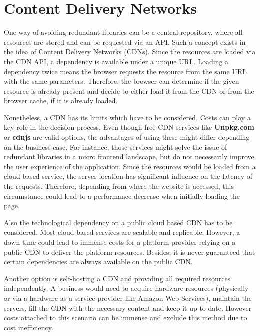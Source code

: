 \chapter{Content Delivery Networks} %
\label{Chapter3}


One way of avoiding redundant libraries can be a central repository, where all resources are stored and can be requested via an API. Such a concept exists in the idea of Content Delivery Networks (CDNs).
Since the resources are loaded via the CDN API, a dependency is available under a unique URL. Loading a dependency twice means the browser requests the resource from the same URL with the same parameters. Therefore, the browser can determine if the given resource is already present and decide to either load it from the CDN or from the browser cache, if it is already loaded.\cite{caching_in_browser}

Nonetheless, a CDN has its limits which have to be considered. Costs can play a key role in the decision process.
Even though free CDN services like \textbf{Unpkg.com} or \textbf{cdnjs} are valid options, the advantages of using these might differ depending on the business case.
For instance, those services might solve the issue of redundant libraries in a micro frontend landscape, but do not necessarily improve the user experience of the application. 
Since the resources would be loaded from a cloud based service, the server location has significant influence on the latency of the requests. Therefore, depending from where the website is accessed, this circumstance could lead to a performance decrease when initially loading the page.\cite{cdn_general}

Also the technological dependency on a public cloud based CDN has to be considered. Most cloud based services are scalable and replicable. However, a down time could lead to immense costs for a platform provider relying on a public CDN to deliver the platform resources.
Besides, it is never guaranteed that certain dependencies are always available on the public CDN.

Another option is self-hosting a CDN and providing all required resources independently. A business would need to acquire hardware-resources (physically or via a hardware-as-a-service provider like Amazon Web Services), maintain the servers, fill the CDN with the necessary content and keep it up to date. However costs attached to this scenario can be immense and exclude this method due to cost inefficiency.\cite{Meassuring_a_commercial_CDN}

